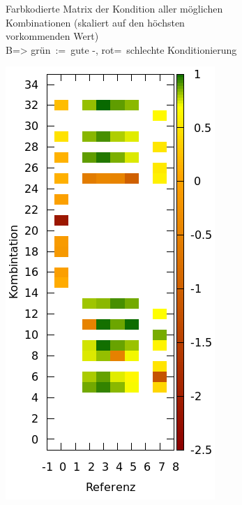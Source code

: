 \begin{figure} [h]
\begin{subfigure}[t]{0.4\textwidth}
                 \caption{Farbkodierte Matrix der Kondition aller möglichen Kombinationen (skaliert auf den höchsten vorkommenden Wert)\\
                 B=> grün~:=~gute -, rot=~schlechte Konditionierung}
                 \label{fig:ConditionMatrix}\textit{}
         \end{subfigure}
%         
\qquad
         \begin{subfigure}[t]{0.4\textwidth}
                 \centering
                 \includegraphics[width=\textwidth]{common/img/60_Results_scaled.png}

\end{subfigure}
\end{figure}
